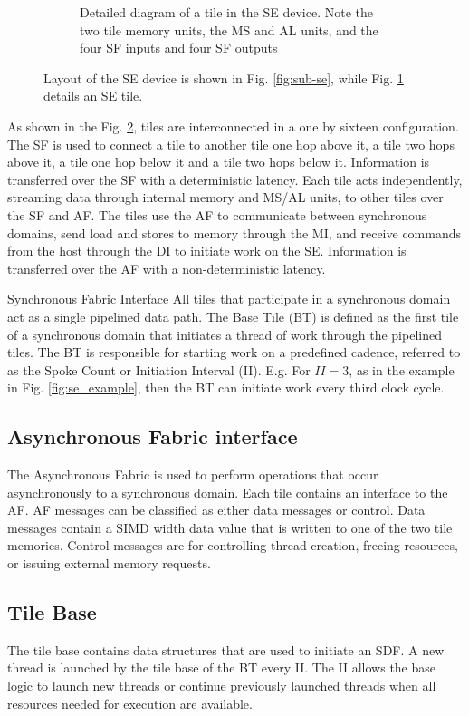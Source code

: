 \begin{figure} [h]
\begin{subfigure}{.5\textwidth}
  \caption{Detailed diagram of a tile in the SE device.
  Note the two tile memory units, the MS and AL units, and the four SF inputs and four SF outputs}
  \label{fig:sub-tile}
  \end{subfigure}
  \caption{
    Layout of the SE device is shown in Fig. \ref{fig:sub-se}, while Fig. \ref{fig:sub-tile} details an SE tile.
  }
  \label{fig:se_diagram}
\end{figure}

As shown in the Fig. \ref{fig:se_diagram}, tiles are interconnected in a one by sixteen configuration.
The SF is used to connect a tile to another tile one hop above it, a tile two hops above it, a tile one hop below it and a tile two hops below it.
Information is transferred over the SF with a deterministic latency. 
Each tile acts independently, streaming data through internal memory and MS/AL units, to other tiles over the SF and AF.
The tiles use the AF to communicate between synchronous domains, send load and stores to memory through the MI, and receive commands from the host through the DI to initiate work on the SE.
Information is transferred over the AF with a non-deterministic latency.


\par{Synchronous Fabric Interface}
All tiles that participate in a synchronous domain act as a single pipelined data path.
The Base Tile (BT) is defined as the first tile of a synchronous domain that initiates a thread of work through the pipelined tiles.
The BT is responsible for starting work on a predefined cadence, referred to as the Spoke Count or Initiation Interval (II).
E.g. For $II = 3$, as in the example in Fig. \ref{fig:se_example}, then the BT can initiate work every third clock cycle.

\subsection{Asynchronous Fabric interface}
The Asynchronous Fabric is used to perform operations that occur asynchronously to a synchronous domain.
Each tile contains an interface to the AF.
AF messages can be classified as either data messages or control.
Data messages contain a SIMD width data value that is written to one of the two tile memories.
Control messages are for controlling thread creation, freeing resources, or issuing external memory requests.

\subsection{Tile Base}
The tile base contains data structures that are used to initiate an SDF.
A new thread is launched by the tile base of the BT every II.
The II allows the base logic to launch new threads or continue previously launched threads when all resources needed for execution are available.

